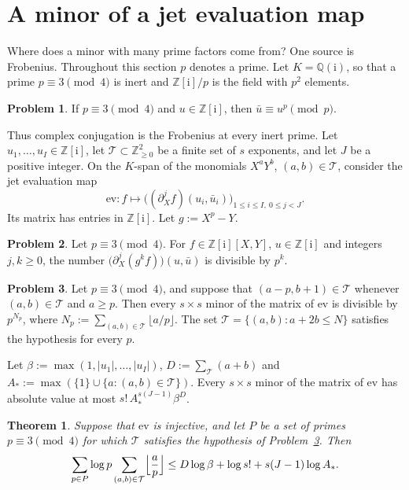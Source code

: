\documentclass[reqno]{amsart}
\theoremstyle{definition}
\newtheorem{problem}{Problem}[section]
\theoremstyle{plain}
\newtheorem{theorem}{Theorem}[section]
\newcommand{\Z}{\mathbb{Z}}
\newcommand{\Q}{\mathbb{Q}}
\newcommand{\ii}{\mathrm{i}}
\begin{document}
\section{A minor of a jet evaluation map}\label{sec:minor}

Where does a minor with many prime factors come from?  One source is Frobenius.  Throughout this section \(p\) denotes a prime.  Let \(K = \Q(\ii)\), so that a prime \(p \equiv 3 \pmod 4\) is inert and \(\Z[\ii]/p\) is the field with \(p^2\) elements.

\begin{problem}\label{pr:frob}
If \(p \equiv 3 \pmod 4\) and \(u \in \Z[\ii]\), then \(\bar u \equiv u^p \pmod p\).
\end{problem}

Thus complex conjugation is the Frobenius at every inert prime.  Let \(u_1, \dots, u_I \in \Z[\ii]\), let \(\mathcal{T} \subset \Z_{\ge 0}^2\) be a finite set of \(s\) exponents, and let \(J\) be a positive integer.  On the \(K\)-span of the monomials \(X^a Y^b\), \((a,b) \in \mathcal{T}\), consider the jet evaluation map
\[
  \mathrm{ev} \colon f \longmapsto \bigl( (\partial_X^j f)(u_i, \bar u_i) \bigr)_{1 \le i \le I,\ 0 \le j < J} .
\]
Its matrix has entries in \(\Z[\ii]\).  Let \(g := X^p - Y\).

\begin{problem}\label{pr:frob-deriv}
Let \(p \equiv 3 \pmod 4\).  For \(f \in \Z[\ii][X, Y]\), \(u \in \Z[\ii]\) and integers \(j, k \ge 0\), the number \(\bigl(\partial_X^j (g^k f)\bigr)(u, \bar u)\) is divisible by \(p^k\).
\end{problem}

\begin{problem}\label{pr:minor-div}
Let \(p \equiv 3 \pmod 4\), and suppose that \((a - p, b + 1) \in \mathcal{T}\) whenever \((a, b) \in \mathcal{T}\) and \(a \ge p\).  Then every \(s \times s\) minor of the matrix of \(\mathrm{ev}\) is divisible by \(p^{N_p}\), where \(N_p := \sum_{(a,b) \in \mathcal{T}} \lfloor a/p \rfloor\).  The set \(\mathcal{T} = \{(a,b) : a + 2b \le N\}\) satisfies the hypothesis for every \(p\).
\end{problem}

Let \(\beta := \max(1, \lvert u_1 \rvert, \dots, \lvert u_I \rvert)\), \(D := \sum_{\mathcal{T}} (a + b)\) and \(A_* := \max(\{1\} \cup \{a : (a,b) \in \mathcal{T}\})\).  Every \(s \times s\) minor of the matrix of \(\mathrm{ev}\) has absolute value at most \(s!\,A_*^{s(J-1)}\beta^D\).

\begin{theorem}\label{thm:minor}
Suppose that \(\mathrm{ev}\) is injective, and let \(P\) be a set of primes \(p \equiv 3 \pmod 4\) for which \(\mathcal{T}\) satisfies the hypothesis of Problem~\ref{pr:minor-div}.  Then
\[
  \sum_{p \in P} \log p \sum_{(a,b) \in \mathcal{T}} \Bigl\lfloor \frac{a}{p} \Bigr\rfloor \le D \log\beta + \log s! + s(J-1)\log A_* .
\]
\end{theorem}
\end{document}
